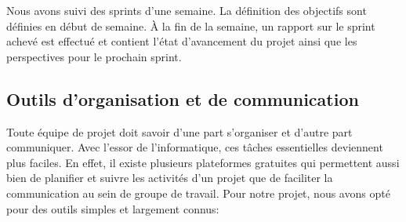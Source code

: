     Nous avons suivi des sprints d'une semaine. La définition des objectifs sont définies en début de semaine. À la fin de la semaine, un rapport sur le sprint achevé est effectué et contient l'état d'avancement du projet ainsi que les perspectives pour le prochain sprint.

    \subsection{Outils d'organisation et de communication}
        Toute équipe de projet doit savoir d’une part s’organiser et d’autre part communiquer. Avec l’essor de l’informatique, ces tâches essentielles deviennent plus faciles. En effet, il existe plusieurs plateformes gratuites qui permettent aussi bien de planifier et suivre les activités d’un projet que de faciliter la communication au sein de groupe de travail. Pour notre projet, nous avons opté pour des outils simples et largement connus:

